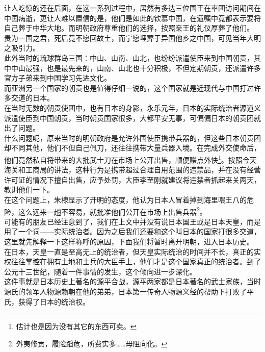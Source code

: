 \begin{multicols}{\theparacolNo}
让人吃惊的还在后面，在这一系列过程中，居然有多达三位国王在率团访问期间在中国病逝，更让人难以置信的是，他们是如此的钦慕中国，在遗嘱中竟都表示要将自己葬于中华大地。而明朝政府尊重他们的选择，按照亲王的礼仪厚葬了他们。\\

贵为一国之君，死后竟不愿回故土，而宁愿埋葬于异国他乡之中国，可见当年大明之吸引力。\\

此外当时的琉球群岛三国：中山、山南、山北，也纷纷派遣使臣来到中国朝贡，其中中山最强，也是最先来的，山南、山北也十分积极，不但定期朝贡，还派遣许多官方子弟来到中国学习先进文化。\\

而亚洲另一个国家的朝贡也是值得仔细一说的，这个国家就是近现代与中国打过许多交道的日本。\\

在当时无数的朝贡使团中，也有日本的身影，永乐元年，日本的实际统治者源道义派遣使臣到中国朝贡，当时朝贡国家很多，大都平安无事，可偏偏日本的朝贡团就出了问题。\\

什么问题呢，原来当时的明朝政府是允许外国使臣携带兵器的，但这些日本朝贡团却不同其他，他们不但自己佩刀，还往往携带大量兵器入境。在完成外交使命后，他们竟然私自将带来的大批武士刀在市场上公开出售，顺便赚点外快\footnote{估计也是因为没有其它的东西可卖。}。按照今天海关和工商局的讲法，这种行为是携带超过合理自用范围的违禁品，并在没有经营许可证的情况下擅自出售，应予处罚，大臣李至刚就建议将违禁者抓起来关两天，教训他们一下。\\

在这个问题上，朱棣显示了开明的态度，他认为日本人冒着掉到海里喂王八的危险，这么远来一趟不容易，就批准他们公开在市场上出售兵器\footnote{外夷修贡，履险蹈危，所费实多……毋阻向化。}。\\

可能有的朋友已经注意到了，我们在上文中并没有说日本国王或是日本天皇，而是用了一个词——实际统治者。因为之后我们还要和这个叫日本的国家打很多交道，这里就先解释一下这样称呼的原因，下面我们将暂时离开明朝，进入日本历史。\\

在日本，天皇一直是至高无上的统治者，但天皇实际统治的时间并不长，真正的实权往往掌控在拥有土地和士兵的大臣手上，他们才是这个国家真正的统治者。到了公元十三世纪，随着一件事情的发生，这个倾向进一步深化。\\

这件事就是日本历史上著名的源平合战，源平两家都是日本著名的武士家族，当时源氏的领军人物源赖朝在他的弟弟，日本第一传奇人物源义经的帮助下打败了平氏，获得了日本的统治权。\\


\end{multicols}
